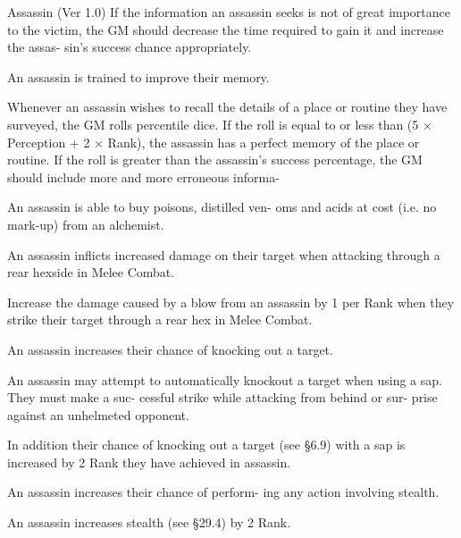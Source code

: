\begin{Chapter}{Assassin (Ver 1.0)}
If the information an assassin seeks is not of great 
importance  to  the  victim, the  GM  should  decrease 
the time required to gain it and increase the assas-
sin’s success chance appropriately. 

An assassin is trained to improve their memory. 

Whenever an assassin wishes to recall the details of 
a place or routine they have surveyed, the GM rolls 
percentile dice. If the roll is equal to or less than (5 
× Perception + 2 × Rank), the assassin has a perfect 
memory of the place or routine. If the roll is greater 
than  the  assassin’s  success  percentage,  the  GM 
should include  more  and  more  erroneous  informa-

An assassin is able to buy poisons, distilled ven-
oms and acids at cost (i.e. no mark-up) from an 
alchemist. 

An  assassin  inflicts  increased  damage  on  their 
target when attacking through a rear hexside in 
Melee Combat. 

Increase  the  damage  caused  by  a  blow  from  an 
assassin by 1 per Rank when they strike their target 
through a rear hex in Melee Combat. 

An  assassin  increases  their  chance  of  knocking 
out a target. 

An assassin may attempt to automatically knockout 
a target when using a sap. They must make a suc-
cessful  strike  while  attacking  from  behind  or  sur-
prise against an unhelmeted opponent. 

In  addition  their  chance  of  knocking  out  a  target 
(see  §6.9)  with  a  sap  is  increased  by  2%
Rank they have achieved in assassin. 

An  assassin  increases  their  chance  of  perform-
ing any action involving stealth. 

An assassin increases stealth (see §29.4) by 2%
Rank. 

\end{Chapter}

